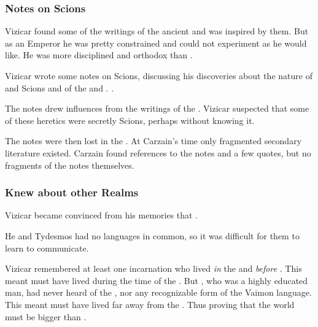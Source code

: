 \subsubsection{Notes on Scions}
Vizicar found some of the writings of the ancient  and was inspired by them. 
But as an Emperor he was pretty constrained and could not experiment as he would like. 
He was more disciplined and orthodox than \Belzir.

Vizicar wrote some notes on Scions, discussing his discoveries about the nature of \Malachim{} and Scions and of the \kenosis{} and \apotheosis. 
. 

The notes drew influences from the writings of the . 
Vizicar suspected that some of these heretics were secretly Scions, perhaps without knowing it. 

The notes were then lost in the \Darkfall. 
At Carzain's time only fragmented secondary literature existed. 
Carzain found references to the notes and a few quotes, but no fragments of the notes themselves. 






\subsubsection{Knew about other Realms}
Vizicar became convinced from his memories that .

He and Tydesmos had no languages in common, so it was difficult for them to learn to communicate. 

Vizicar remembered at least one incarnation who lived \emph{in} the \VaimonCaliphate and \emph{before} \Tydesmos{}. 
This meant \Tydesmos{} must have lived during the time of the \VaimonCaliphate. 
But \Tydesmos{}, who was a highly educated man, had never heard of the \caliphate, nor any recognizable form of the Vaimon language. 
This meant \Tydesmos{} must have lived far away from the \caliphate. 
Thus proving that the world must be bigger than \Azmith. 

